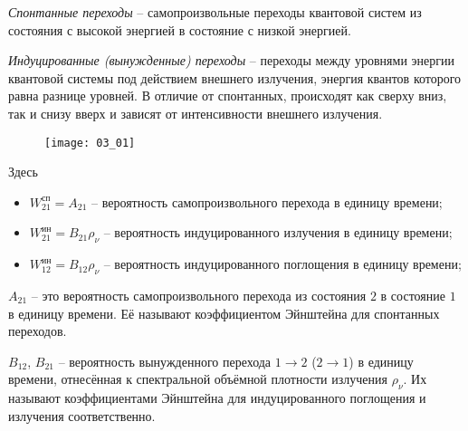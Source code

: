 

\emph{Спонтанные переходы} -- самопроизвольные переходы квантовой систем
из состояния с высокой энергией в состояние с низкой энергией.

\emph{Индуцированные (вынужденные) переходы} -- переходы между уровнями энергии
квантовой системы под действием внешнего излучения, энергия квантов которого
равна разнице уровней. В отличие от спонтанных, происходят как сверху вниз, так
и снизу вверх и зависят от интенсивности внешнего излучения.


\begin{figure}[h!]
    \center
    \texttt{[image: 03\_01]}
\end{figure}
Здесь
\begin{itemize}
    \item \( W_{21}^\text{сп} = A_{21} \) -- вероятность самопроизвольного
        перехода в единицу времени;
    \item \( W_{21}^\text{ин} = B_{21}\rho_\nu \) -- вероятность индуцированного
        излучения в единицу времени;
    \item \( W_{12}^\text{ин} = B_{12}\rho_\nu \) -- вероятность индуцированного
        поглощения в единицу времени;
\end{itemize}

\( A_{21} \) -- это вероятность самопроизвольного перехода из состояния
\( 2 \) в состояние \( 1 \) в единицу времени. Её называют коэффициентом
Эйнштейна для спонтанных переходов.

\( B_{12} \), \( B_{21} \) -- вероятность вынужденного перехода
\( 1 \rightarrow 2 \) (\( 2 \rightarrow 1 \)) в единицу времени, отнесённая к
спектральной объёмной плотности излучения \( \rho_\nu \). Их называют
коэффициентами Эйнштейна для индуцированного поглощения и излучения
соответственно.


